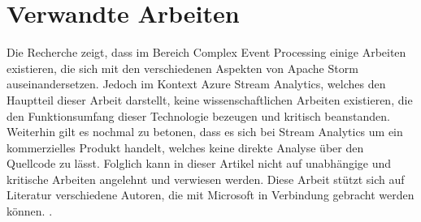 \section{Verwandte Arbeiten}
Die Recherche zeigt, dass im Bereich Complex Event Processing einige Arbeiten existieren, die sich mit den verschiedenen Aspekten von Apache Storm auseinandersetzen. Jedoch im Kontext Azure Stream Analytics, welches den Hauptteil dieser Arbeit darstellt, keine wissenschaftlichen Arbeiten existieren, die den Funktionsumfang dieser Technologie bezeugen und kritisch beanstanden. Weiterhin gilt es nochmal zu betonen, dass es sich bei Stream Analytics um ein kommerzielles Produkt handelt, welches keine direkte Analyse über den Quellcode zu lässt. Folglich kann in dieser Artikel nicht auf unabhängige und kritische Arbeiten angelehnt und verwiesen werden. Diese Arbeit stützt sich auf Literatur verschiedene Autoren, die mit Microsoft in Verbindung gebracht werden können. \cite{Familiar.2017} \cite{Klein.2017}. 